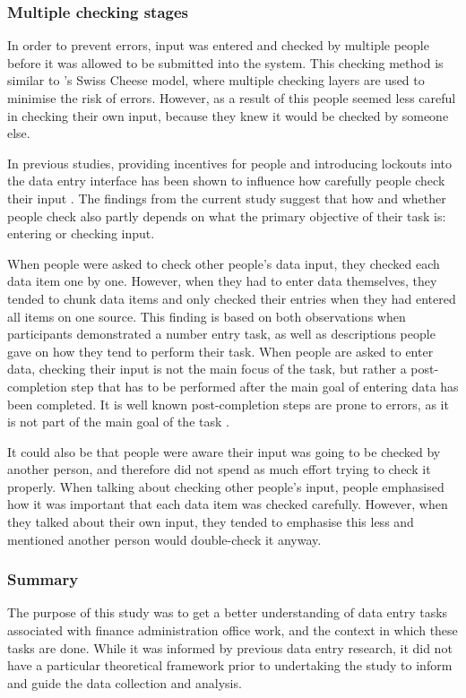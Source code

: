 \documentclass[11pt,oneside]{report}
\begin{document}
\subsubsection{Multiple checking stages}
In order to prevent errors, input was entered and checked by multiple people before it was allowed to be submitted into the system. This checking method is similar to \citeauthor{Reason1990}'s \citeyearpar{Reason1990}  Swiss Cheese model, where multiple checking layers are used to minimise the risk of errors. However, as a result of this people seemed less careful in checking their own input, because they knew it would be checked by someone else. 

In previous studies, providing incentives for people and introducing lockouts into the data entry interface has been shown to influence how carefully people check their input \citep{Li2015, Gould2015}. The findings from the current study suggest that how and whether people check also partly depends on what the primary objective of their task is: entering or checking input.

When people were asked to check other people's data input, they checked each data item one by one. However, when they had to enter data themselves, they tended to chunk data items and only checked their entries when they had entered all items on one source. This finding is based on both observations when participants demonstrated a number entry task, as well as descriptions people gave on how they tend to perform their task. When people are asked to enter data, checking their input is not the main focus of the task, but rather a post-completion step that has to be performed after the main goal of entering data has been completed. It is well known post-completion steps are prone to errors, as it is not part of the main goal of the task \citep[e.g.][]{Byrne1995, Li2006, Li2008}.

It could also be that people were aware their input was going to be checked by another person, and therefore did not spend as much effort trying to check it properly. When talking about checking other people's input, people emphasised how it was important that each data item was checked carefully. However, when they talked about their own input, they tended to emphasise this less and mentioned another person would double-check it anyway.

\subsubsection{Summary}
The purpose of this study was to get a better understanding of data entry tasks associated with finance administration office work, and the context in which these tasks are done. While it was informed by previous data entry research, it did not have a particular theoretical framework prior to undertaking the study to inform and guide the data collection and analysis. 
\end{document}
